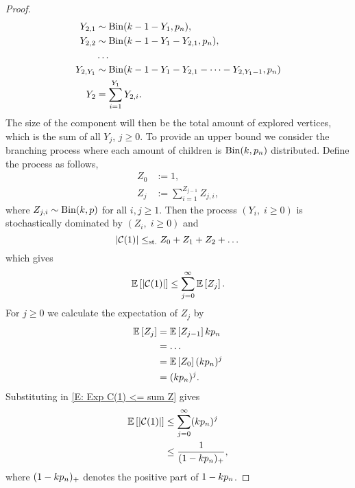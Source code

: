 \begin{proof}
\begin{equation*}
	\begin{aligned}
	Y_{2,1} &\sim \operatorname*{Bin}(k-1-Y_1, p_n), \\ 
	Y_{2,2} &\sim \operatorname*{Bin}(k-1-Y_1-Y_{2,1}, p_n), \\
	&\dots \\
	Y_{2,Y_1} &\sim \operatorname*{Bin}(k-1-Y_1-Y_{2,1}-\dots-Y_{2,Y_1-1}, p_n) \\
	Y_2 &= \sum_{i=1}^{Y_1} Y_{2,i}.
	\end{aligned}
	\end{equation*}
	The size of the component will then be the total amount of explored vertices,
	which is the sum of all $Y_j$, $j \geq 0$.
	To provide an upper bound we consider the branching process where each amount of children is $\operatorname*{Bin}(k, p_n)$ distributed.
	Define the process as follows,
	\begin{equation*}
	\begin{aligned}
	Z_0 &:= 1, \\
	Z_j &:= \sum_{i=1}^{Z_{j-1}} Z_{j,i},
	\end{aligned}
	\end{equation*}
	where $Z_{j,i} \sim\operatorname*{Bin}(k,p)$ for all $i,j \geq 1$.
	Then the process $(Y_i, \; i\geq 0)$ is stochastically dominated by 
	$(Z_i, \; i\geq 0)$ and
	\begin{equation*}
	|\mathcal{C}(1)| \leq_{\text{st.}} Z_0 + Z_1 + Z_2 + \dots
	\end{equation*}
	which gives
	\begin{equation} \label{E: Exp C(1) <= sum Z}
		\mathbb{E} \left[ |\mathcal{C}(1)| \right] \leq \sum_{j=0}^{\infty}\mathbb{E} \left[ Z_j \right].
	\end{equation}	
	For $j\geq0$ we calculate the expectation of $Z_j$ by
	\begin{equation*}
	\begin{aligned}
	\mathbb{E} \left[ Z_j \right] 
	&= \mathbb{E} \left[ Z_{j-1} \right]k p_n \\
	&= \dots \\
	&= \mathbb{E} \left[ Z_0 \right](kp_n)^j \\
	&= (kp_n)^j.
	\end{aligned}		
	\end{equation*}
	Substituting in \eqref{E: Exp C(1) <= sum Z} gives
	\begin{equation} \label{E: Exp C(1) <= frac kp}
	\begin{aligned}
	\mathbb{E} \left[ |\mathcal{C}(1)| \right] 
	&\leq \sum_{j=0}^{\infty} (k p_n)^j \\
	&\leq \frac{1}{(1- kp_n)_+},
	\end{aligned}		
	\end{equation}
	where $(1- kp_n)_+$ denotes the positive part of $1- kp_n$.

\end{proof}
